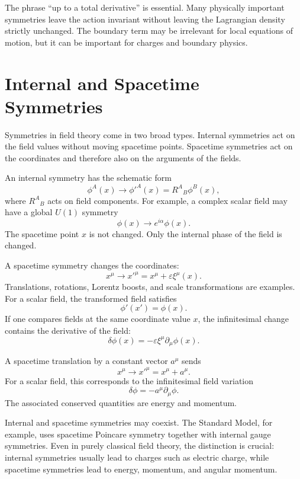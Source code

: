 The phrase ``up to a total derivative'' is essential. Many physically important
symmetries leave the action invariant without leaving the Lagrangian density
strictly unchanged. The boundary term may be irrelevant for local equations of
motion, but it can be important for charges and boundary physics.

\section{Internal and Spacetime Symmetries}

Symmetries in field theory come in two broad types. Internal symmetries act on
the field values without moving spacetime points. Spacetime symmetries act on
the coordinates and therefore also on the arguments of the fields.

An internal symmetry has the schematic form
\[
    \phi^A(x)\longrightarrow \phi'^A(x)=R^A{}_B\phi^B(x),
\]
where \(R^A{}_B\) acts on field components. For example, a complex scalar field
may have a global \(U(1)\) symmetry
\[
    \phi(x)\longrightarrow e^{i\alpha}\phi(x).
\]
The spacetime point \(x\) is not changed. Only the internal phase of the field
is changed.

A spacetime symmetry changes the coordinates:
\[
    x^\mu\longrightarrow x'^\mu=x^\mu+\varepsilon\xi^\mu(x).
\]
Translations, rotations, Lorentz boosts, and scale transformations are examples.
For a scalar field, the transformed field satisfies
\[
    \phi'(x')=\phi(x).
\]
If one compares fields at the same coordinate value \(x\), the infinitesimal
change contains the derivative of the field:
\[
    \delta\phi(x)=-\varepsilon\xi^\mu\partial_\mu\phi(x).
\]

\begin{examplebox}
A spacetime translation by a constant vector \(a^\mu\) sends
\[
    x^\mu\longrightarrow x'^\mu=x^\mu+a^\mu.
\]
For a scalar field, this corresponds to the infinitesimal field variation
\[
    \delta\phi=-a^\mu\partial_\mu\phi.
\]
The associated conserved quantities are energy and momentum.
\end{examplebox}

Internal and spacetime symmetries may coexist. The Standard Model, for example,
uses spacetime Poincare symmetry together with internal gauge symmetries. Even
in purely classical field theory, the distinction is crucial: internal
symmetries usually lead to charges such as electric charge, while spacetime
symmetries lead to energy, momentum, and angular momentum.


